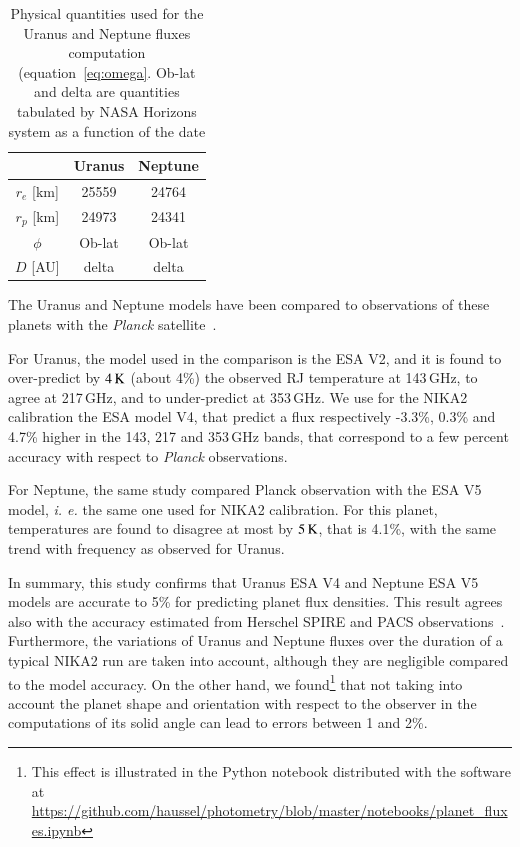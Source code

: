 \documentclass[traditionalabstract]{aa}
\begin{document}
\begin{appendix}
\begin{table}[!ht]
\begin{center}
\begin{tabular}{|c|c|c|}
\hline
     & Uranus & Neptune \\
\hline
$r_{e}$ [km]  & 25559 & 24764 \\ 
\hline
$r_{p}$ [km]  & 24973 & 24341  \\
\hline
$\phi$         & Ob-lat & Ob-lat \\
\hline
$D$   [AU]    & delta   & delta \\
\hline
\end{tabular}
\end{center}
\caption[Primary calibrator flux models]{Physical quantities used for the Uranus and Neptune fluxes
  computation (equation~\ref{eq:omega}. Ob-lat and delta are quantities 
  tabulated by NASA Horizons system as a function of the date}
\label{tab:planetphysparam}
\end{table}

The Uranus and Neptune models have been compared to 
observations of these planets with the \emph{Planck}
satellite~\citep{PLCK-LII}.

For Uranus, the model used in the comparison
is the ESA V2, and it is found to over-predict by $4\,\rm{K}$ (about 4\%) the
observed RJ temperature at 143\,GHz, to agree at 217\,GHz, and
to under-predict at 353\,GHz. We use for the NIKA2 calibration the ESA
model V4, that predict a flux respectively -3.3\%, 0.3\% and 4.7\% higher in the
143, 217 and 353\,GHz bands, that correspond to a few percent accuracy
with respect to \emph{Planck} observations.

For Neptune, the same study compared Planck observation with the ESA V5
model, {\it i. e.} the same one used for NIKA2 calibration. For this
planet, temperatures are found to disagree at most by $5\, \rm{K}$, that is 4.1\%,
with the same trend with frequency as observed for Uranus.

In summary, this study confirms that Uranus ESA V4 and Neptune ESA V5
models are accurate to 5\% for predicting planet flux densities. This
result agrees also with the accuracy estimated from Herschel SPIRE
and PACS observations~\citep{Mueller2016, Swinyard2014}. 
Furthermore, the variations of Uranus and Neptune fluxes over the duration of a typical
NIKA2 run are taken into account, although they are negligible
compared to the model accuracy. On the other hand, we
found\footnote{This effect is illustrated in the Python notebook
  distributed with the software at \url{https://github.com/haussel/photometry/blob/master/notebooks/planet_fluxes.ipynb}} that not
taking into account the planet shape and orientation with respect to
the observer in the computations of its solid angle can lead to errors
between 1 and 2\%.



\end{appendix}
\end{document}
